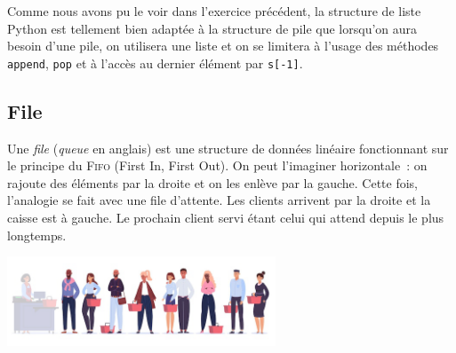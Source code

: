 \documentclass{magnoliaold}
\begin{document}
\vspace{2ex}
Comme nous avons pu le voir dans l'exercice précédent, la structure de liste Python
est tellement bien adaptée à la structure de pile que lorsqu'on aura besoin d'une pile, on utilisera une
liste et on se limitera à l'usage des méthodes \verb!append!, \verb!pop! et à l'accès au dernier élément
par \verb!s[-1]!.


\subsection{File}

Une \emph{file} (\emph{queue} en anglais) est une structure de données linéaire fonctionnant
sur le principe du \textsc{Fifo} (First
In, First Out). On peut l'imaginer horizontale~: on rajoute des éléments par la droite
et on les enlève par la gauche. Cette fois, l'analogie se fait avec une file
d'attente. Les clients arrivent par la droite et la caisse est à gauche. Le prochain client
servi étant celui qui attend depuis le plus longtemps.

\begin{center}
  \includegraphics[width=0.6\textwidth]{../../commun/images/python-cours-file}
  \end{center}




\end{document}

